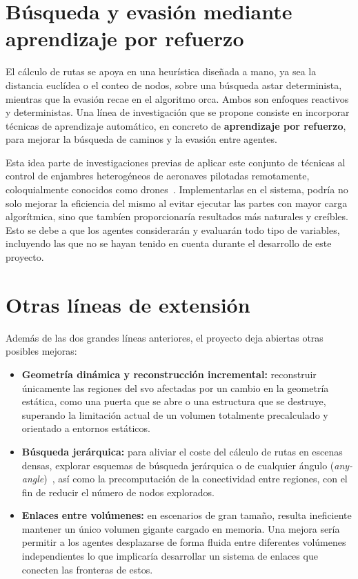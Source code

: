 \section{Búsqueda y evasión mediante aprendizaje por refuerzo}

El cálculo de rutas se apoya en una heurística diseñada a mano, ya sea la distancia euclídea o el conteo de nodos, sobre una búsqueda \gls{astar} determinista, mientras que la evasión recae en el algoritmo \acrshort{orca}.
Ambos son enfoques reactivos y deterministas.
Una línea de investigación que se propone consiste en incorporar técnicas de aprendizaje automático, en concreto de \textbf{aprendizaje por refuerzo}, para mejorar la búsqueda de caminos y la evasión entre agentes.

Esta idea parte de investigaciones previas de aplicar este conjunto de técnicas al control de enjambres heterogéneos de aeronaves pilotadas remotamente, coloquialmente conocidos como drones~\cite{puente_castro_2023}.
Implementarlas en el sistema, podría no solo mejorar la eficiencia del mismo al evitar ejecutar las partes con mayor carga algorítmica, sino que tambíen proporcionaría resultados más naturales y creíbles.
Esto se debe a que los agentes considerarán y evaluarán todo tipo de variables, incluyendo las que no se hayan tenido en cuenta durante el desarrollo de este proyecto.

\section{Otras líneas de extensión}

Además de las dos grandes líneas anteriores, el proyecto deja abiertas otras posibles mejoras:

\begin{itemize}
    \item \textbf{Geometría dinámica y reconstrucción incremental:} reconstruir únicamente las regiones del \acrshort{svo} afectadas por un cambio en la geometría estática, como una puerta que se abre o una estructura que se destruye, superando la limitación actual de un volumen totalmente precalculado y orientado a entornos estáticos.
    \item \textbf{Búsqueda jerárquica:} para aliviar el coste del cálculo de rutas en escenas densas, explorar esquemas de búsqueda jerárquica o de cualquier ángulo (\textit{any-angle})~\cite{harabor2013optimal}, así como la precomputación de la conectividad entre regiones, con el fin de reducir el número de nodos explorados.
    \item \textbf{Enlaces entre volúmenes:} en escenarios de gran tamaño, resulta ineficiente mantener un único volumen gigante cargado en memoria.
    Una mejora sería permitir a los agentes desplazarse de forma fluida entre diferentes volúmenes independientes lo que implicaría desarrollar un sistema de enlaces que conecten las fronteras de estos.
\end{itemize}
